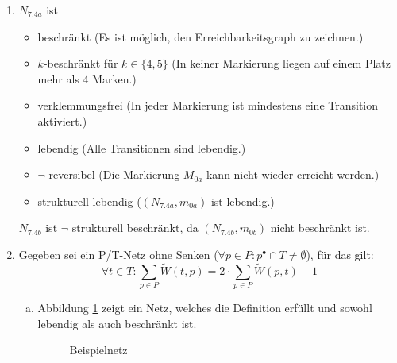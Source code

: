 \documentclass[a4paper]{scrartcl}
\begin{document}
\begin{enumerate}
    \item
        $N_{7.4a}$ ist
        \begin{itemize}
            \item beschränkt (Es ist möglich, den Erreichbarkeitsgraph zu
                zeichnen.)
            \item $k$-beschränkt für $k \in \{4,5\}$ (In keiner Markierung
                liegen auf einem Platz mehr als 4 Marken.)
            \item verklemmungsfrei (In jeder Markierung ist mindestens eine
                Transition aktiviert.)
            \item lebendig (Alle Transitionen sind lebendig.)
            \item $\lnot$ reversibel (Die Markierung $M_{0a}$ kann nicht wieder
                erreicht werden.)
            \item strukturell lebendig ($(N_{7.4a}, m_{0a})$ ist lebendig.)
        \end{itemize}

        $N_{7.4b}$ ist $\lnot$ strukturell beschränkt, da $(N_{7.4b}, m_{0b})$
        nicht beschränkt ist.

    \item
        Gegeben sei ein P/T-Netz ohne Senken
        ($\forall p \in P : p^\bullet \cap T \neq \emptyset$), für das gilt:
        \begin{equation}
            \forall t \in T : \sum_{p \in P} \widetilde{W}(t, p)
            = 2 \cdot \sum_{p \in P} \widetilde{W}(p, t) - 1
            \label{eq:def}
        \end{equation}
        
        \begin{enumerate}[(a)]
            \item
                Abbildung \ref{fig:beispiel} zeigt ein Netz, welches die
                Definition erfüllt und sowohl lebendig als auch beschränkt ist.
                \begin{figure}[h]
                    \centering
                    \caption{Beispielnetz}
                    \label{fig:beispiel}
                \end{figure}


\end{enumerate}
\end{enumerate}
\end{document}
